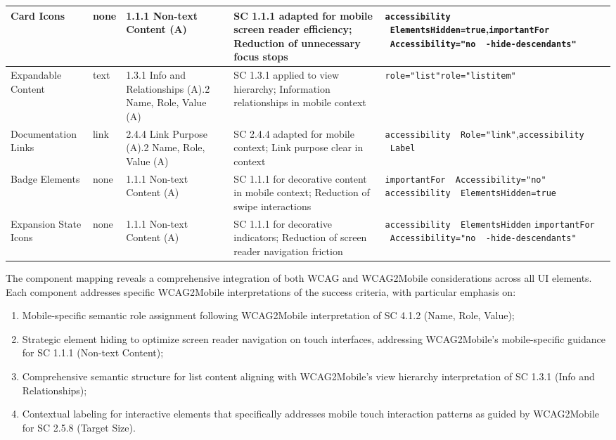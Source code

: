 \begin{longtable}[c]{|C{2.9cm}|C{2cm}|C{2.8cm}|C{3.2cm}|C{4.7cm}|}
\hline
Card Icons & none & 1.1.1 Non-text Content (A) & SC 1.1.1 adapted for mobile screen reader efficiency; Reduction of unnecessary focus stops & \texttt{accessibility \ ElementsHidden=true},\newline \texttt{importantFor \ Accessibility="no \ -hide-descendants"} \\
\hline
Expandable Content & text & 1.3.1 Info and Relationships (A).2 Name, Role, Value (A) & SC 1.3.1 applied to view hierarchy; Information relationships in mobile context & \texttt{role="list"}\newline \texttt{role="listitem"} \\
\hline
Documentation Links & link & 2.4.4 Link Purpose (A).2 Name, Role, Value (A) & SC 2.4.4 adapted for mobile context; Link purpose clear in context & \texttt{accessibility \ Role="link"},\newline \texttt{accessibility \ Label} \\
\hline
Badge Elements & none & 1.1.1 Non-text Content (A) & SC 1.1.1 for decorative content in mobile context; Reduction of swipe interactions & \texttt{importantFor \ Accessibility="no"} \newline \texttt{accessibility \ ElementsHidden=true} \\
\hline
Expansion State Icons & none & 1.1.1 Non-text Content (A) & SC 1.1.1 for decorative indicators; Reduction of screen reader navigation friction & \texttt{accessibility \ ElementsHidden} \newline \texttt{importantFor \ Accessibility="no \ -hide-descendants"} \\
\end{longtable}
\FloatBarrier

The component mapping reveals a comprehensive integration of both WCAG and WCAG2Mobile considerations across all UI elements. Each component addresses specific WCAG2Mobile interpretations of the success criteria, with particular emphasis on:

\begin{enumerate}
    \item Mobile-specific semantic role assignment following WCAG2Mobile interpretation of SC 4.1.2 (Name, Role, Value);
    
    \item Strategic element hiding to optimize screen reader navigation on touch interfaces, addressing WCAG2Mobile's mobile-specific guidance for SC 1.1.1 (Non-text Content);
    
    \item Comprehensive semantic structure for list content aligning with WCAG2Mobile's view hierarchy interpretation of SC 1.3.1 (Info and Relationships);
    
    \item Contextual labeling for interactive elements that specifically addresses mobile touch interaction patterns as guided by WCAG2Mobile for SC 2.5.8 (Target Size).
\end{enumerate}

